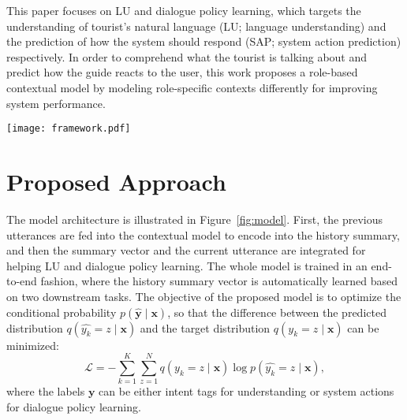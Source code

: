 \documentclass[11pt,letterpaper]{article}
\begin{document}
This paper focuses on LU and dialogue policy learning, which targets the understanding of tourist's natural language (LU; language understanding) and the prediction of how the system should respond (SAP; system action prediction) respectively.
In order to comprehend what the tourist is talking about and predict how the guide reacts to the user, this work proposes a role-based contextual model by modeling role-specific contexts differently for improving system performance.

\begin{figure*}[t]
\centering
\texttt{[image: framework.pdf]}
\vspace{-3mm}
\caption{Illustration of the proposed role-based contextual model.}
\label{fig:model}
\end{figure*}

\section{Proposed Approach}
\label{sec:model}

The model architecture is illustrated in Figure~\ref{fig:model}.
First, the previous utterances are fed into the contextual model to encode into the history summary, and then the summary vector and the current utterance are integrated for helping LU and dialogue policy learning.
The whole model is trained in an end-to-end fashion, where the history summary vector is automatically learned based on two downstream tasks.
The objective of the proposed model is to optimize the conditional probability $p(\mathbf{\hat{y}}\mid \mathbf{x})$, so that the difference between the predicted distribution $q(\hat{y_k}=z\mid \mathbf{x})$ and the target distribution $q(y_k=z\mid \mathbf{x})$ can be minimized:
\begin{equation}
\mathcal{L}=-\sum_{k=1}^{K}\sum_{z=1}^{N}q(y_k=z\mid \mathbf{x}) \log p(\hat{y_k}=z\mid \mathbf{x}),
\end{equation}
where the labels $\textbf{y}$ can be either intent tags for understanding or system actions for dialogue policy learning.
\end{document}
